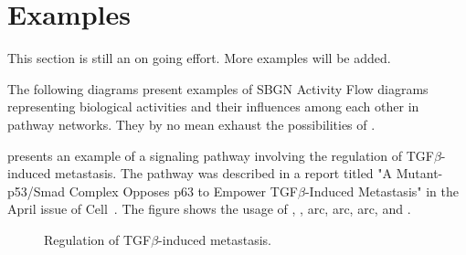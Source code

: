 
\chapter{Examples}

\color{red}
This section is still an on going effort.  More examples will be added.

\normalcolor


The following diagrams present examples of SBGN Activity Flow diagrams representing biological activities and their influences among each other in pathway networks.  They by no mean exhaust the possibilities of \SBGNAFLone.

 presents an example of a signaling pathway involving the regulation of TGF$\beta$-induced metastasis.  The pathway was described in a report titled "A Mutant-p53/Smad Complex Opposes p63 to Empower TGF$\beta$-Induced Metastasis" in the April issue of Cell~\cite{Adorno:2009}.  The figure shows the usage of , ,  arc,  arc,  arc, and .

\begin{figure}
\begin{center}
\caption{Regulation of TGF$\beta$-induced metastasis.}\label{fig:TGF}
\end{center}
\end{figure}


